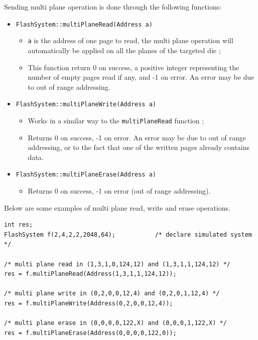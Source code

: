 Sending multi plane operation is done through the following functions:

\begin{itemize}
  \item \verb+FlashSystem::multiPlaneRead(Address a)+
  \begin{itemize}
    \item \verb+a+ is the address of one page to read, the multi plane operation will automatically be applied on all the planes of the targeted die ;
    \item This function return 0 on success, a positive integer representing the number of empty pages read if any, and -1 on error. An error may be due to out of range addressing.
  \end{itemize}
  
  \item \verb+FlashSystem::multiPlaneWrite(Address a)+
  \begin{itemize}
    \item Works in a similar way to the \verb+multiPlaneRead+ function ;
    \item Returns 0 on success, -1 on error. An error may be due to out of range addressing, or to the fact that one of the written pages already contains data.
  \end{itemize}
  
  \item \verb+FlashSystem::multiPlaneErase(Address a)+
  \begin{itemize}
    \item Returns 0 on success, -1 on error (out of range addressing).
  \end{itemize}
\end{itemize}

Below are some examples of multi plane read, write and erase operations.

\begin{lstlisting}
int res;
FlashSystem f(2,4,2,2,2048,64);           /* declare simulated system */

/* multi plane read in (1,3,1,0,124,12) and (1,3,1,1,124,12) */
res = f.multiPlaneRead(Address(1,3,1,1,124,12));

/* multi plane write in (0,2,0,0,12,4) and (0,2,0,1,12,4) */
res = f.multiPlaneWrite(Address(0,2,0,0,12,4));

/* multi plane erase in (0,0,0,0,122,X) and (0,0,0,1,122,X) */
res = f.multiPlaneErase(Address(0,0,0,0,122,0));
\end{lstlisting}

